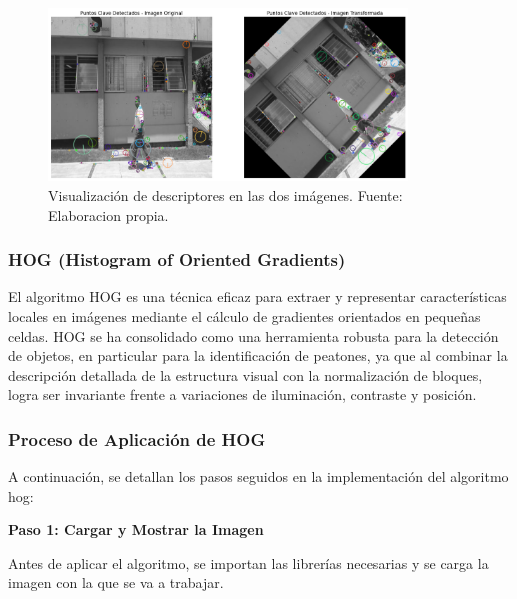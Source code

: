 \documentclass[a4paper]{article}
\begin{document}
\begin{figure}[H]
    \centering
    \includegraphics[width=0.85\textwidth]{images/sift_inv_des.png}
    \caption{Visualización de descriptores en las dos imágenes. Fuente: Elaboracion propia.}
\end{figure}


\subsubsection{HOG (Histogram of Oriented Gradients)}

El algoritmo HOG es una técnica eficaz para extraer y representar características locales en imágenes mediante el cálculo de gradientes orientados en pequeñas celdas. HOG se ha consolidado como una herramienta robusta para la detección de objetos, en particular para la identificación de peatones, ya que al combinar la descripción detallada de la estructura visual con la normalización de bloques, logra ser invariante frente a variaciones de iluminación, contraste y posición. 


\subsubsection{Proceso de Aplicación de HOG}

A continuación, se detallan los pasos seguidos en la implementación del algoritmo hog:
\par\vspace{0.5cm}

\textbf{Paso 1: Cargar y Mostrar la Imagen}
\par\vspace{0.5cm}

Antes de aplicar el algoritmo, se importan las librerías necesarias y se carga la imagen con la que se va a trabajar.
\end{document}
